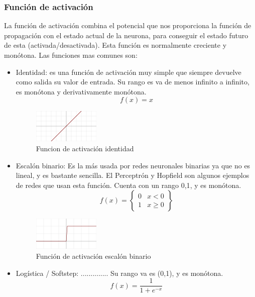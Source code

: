 \subsubsection {Función de activación}
La función de activación combina el potencial que nos proporciona la función de propagación con el estado actual de la neurona, para conseguir el estado futuro de esta (activada/desactivada). Esta función es normalmente creciente y monótona. Las funciones mas comunes son:
\begin{itemize}
\item Identidad: es una función de activación muy simple que siempre devuelve como salida su valor de entrada. Su rango es va de menos infinito a infinito, es monótona y derivativamente monótona.
\begin{equation}
f(x) = x
\end{equation}
\begin{figure}[htp]
\centering
\includegraphics[scale=1]{images/Activation_identity.png}
\caption{Funcion de activación identidad}
\end{figure}
\item Escalón binario: Es la más usada por redes neuronales binarias ya que no es lineal, y es bastante sencilla. El Perceptrón y Hopfield son algunos ejemplos de redes que usan esta función. Cuenta con un rango {0,1}, y es monótona.
\begin{equation}
f(x) = \begin{Bmatrix}
0 & x<0\\
1 & x\geq 0
\end{Bmatrix}
\end{equation}
\begin{figure}[htp]
\centering
\includegraphics[scale=1]{images/Activation_binary_step.png}
\caption{Función de activación escalón binario}
\end{figure}
\item Logística / Softstep: .............. Su rango va es (0,1), y es monótona.
\begin{equation}
f(x) = \frac{1}{1+e^{-x}}
\end{equation}
\begin{figure}[htp]

\end{figure}
\end{itemize}
